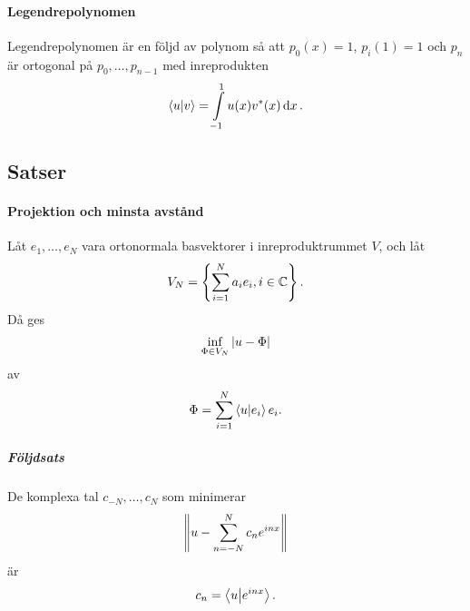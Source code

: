 \paragraph{Legendrepolynomen}
Legendrepolynomen är en följd av polynom så att $p_{0}(x) = 1$, $p_{i}(1) = 1$ och $p_{n}$ är ortogonal på $p_{0}, \dots, p_{n - 1}$ med inreprodukten
\begin{align*}
	\bra{u}\ket{v} = \int\limits_{-1}^{1}u(x)v^{*}(x)\dd{x}.
\end{align*}

\subsection{Satser}

\paragraph{Projektion och minsta avstånd}
Låt $e_{1}, \dots, e_{N}$ vara ortonormala basvektorer i inreproduktrummet $V$, och låt
\begin{align*}
	V_{N} = \left\{\sum\limits_{i = 1}^{N}a_{i}e_{i}, i\in\mathbb{C}\right\}.
\end{align*}
Då ges
\begin{align*}
	\inf\limits_{\Phi\in V_{N}}\abs{u - \Phi}
\end{align*}
av
\begin{align*}
	\Phi = \sum\limits_{i = 1}^{N}\bra{u}\ket{e_{i}}e_{i}.
\end{align*}

\proof

\subparagraph{Följdsats}
De komplexa tal $c_{-N}, \dots, c_{N}$ som minimerar
\begin{align*}
	\norm{u - \sum\limits_{n = -N}^{N}c_{n}e^{inx}}
\end{align*}
är
\begin{align*}
	c_{n} = \bra{u}\ket{e^{inx}}.
\end{align*}

